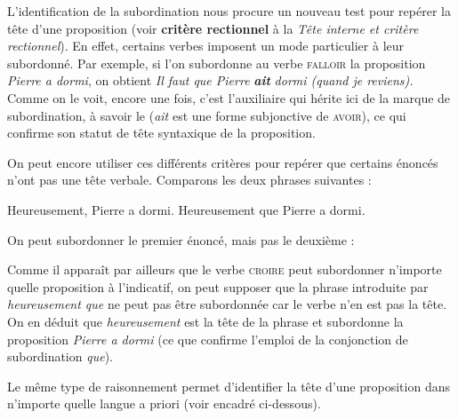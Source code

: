L’identification de la subordination nous procure un nouveau test pour repérer la tête d’une proposition (voir \textbf{critère rectionnel} à la  \textit{Tête interne et critère rectionnel}). En effet, certains verbes imposent un mode particulier à leur subordonné. Par exemple, si l’on subordonne au verbe \textsc{falloir} la proposition \textit{Pierre a dormi}, on obtient \textit{Il faut que Pierre} \textbf{\textit{ait}} \textit{dormi (quand je reviens).} Comme on le voit, encore une fois, c’est l’auxiliaire qui hérite ici de la marque de subordination, à savoir le  (\textit{ait} est une forme subjonctive de \textsc{avoir}), ce qui confirme son statut de tête syntaxique de la proposition.

On peut encore utiliser ces différents critères pour repérer que certains énoncés n’ont pas une tête verbale. Comparons les deux phrases suivantes :

\ea 
  \ea Heureusement, Pierre a dormi.
  \ex Heureusement que Pierre a dormi.
  \z
\z

On peut subordonner le premier énoncé, mais pas le deuxième :

\ea
  \z
\z

Comme il apparaît par ailleurs que le verbe \textsc{croire} peut subordonner n’importe quelle proposition à l’indicatif, on peut supposer que la phrase introduite par \textit{heureusement que} ne peut pas être subordonnée car le verbe n’en est pas la tête. On en déduit que \textit{heureusement} est la tête de la phrase et subordonne la proposition \textit{Pierre a dormi} (ce que confirme l’emploi de la conjonction de subordination \textit{que}).

Le même type de raisonnement permet d’identifier la tête d’une proposition dans n’importe quelle langue a priori (voir encadré ci-dessous).

